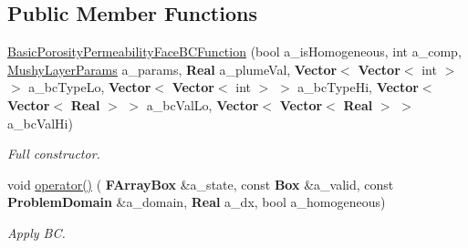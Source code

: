 \subsection*{Public Member Functions}
\begin{DoxyCompactItemize}
\item 
\mbox{\label{class_basic_porosity_permeability_face_b_c_function_a9c4f07215d310756b2cb65d57566c10c}} 
\hyperlink{class_basic_porosity_permeability_face_b_c_function_a9c4f07215d310756b2cb65d57566c10c}{Basic\+Porosity\+Permeability\+Face\+B\+C\+Function} (bool a\+\_\+is\+Homogeneous, int a\+\_\+comp, \hyperlink{class_mushy_layer_params}{Mushy\+Layer\+Params} a\+\_\+params, \textbf{ Real} a\+\_\+plume\+Val, \textbf{ Vector}$<$ \textbf{ Vector}$<$ int $>$ $>$ a\+\_\+bc\+Type\+Lo, \textbf{ Vector}$<$ \textbf{ Vector}$<$ int $>$ $>$ a\+\_\+bc\+Type\+Hi, \textbf{ Vector}$<$ \textbf{ Vector}$<$ \textbf{ Real} $>$ $>$ a\+\_\+bc\+Val\+Lo, \textbf{ Vector}$<$ \textbf{ Vector}$<$ \textbf{ Real} $>$ $>$ a\+\_\+bc\+Val\+Hi)
\begin{DoxyCompactList}\small\item\em Full constructor. \end{DoxyCompactList}\item 
\mbox{\label{class_basic_porosity_permeability_face_b_c_function_a1acbb0ff29e6fe27f3a0907c611bddf2}} 
void \hyperlink{class_basic_porosity_permeability_face_b_c_function_a1acbb0ff29e6fe27f3a0907c611bddf2}{operator()} (\textbf{ F\+Array\+Box} \&a\+\_\+state, const \textbf{ Box} \&a\+\_\+valid, const \textbf{ Problem\+Domain} \&a\+\_\+domain, \textbf{ Real} a\+\_\+dx, bool a\+\_\+homogeneous)
\begin{DoxyCompactList}\small\item\em Apply BC. \end{DoxyCompactList}\end{DoxyCompactItemize}
